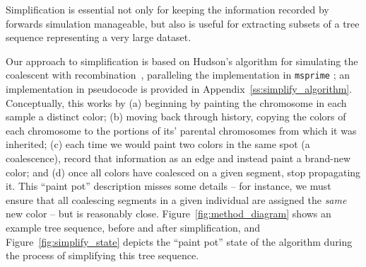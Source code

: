 \documentclass{article}
\newcommand{\msprime}{\texttt{msprime}}
\begin{document}
Simplification is essential
not only for keeping the information recorded by forwards simulation manageable,
but also is useful for extracting subsets of a tree sequence representing a very large dataset.

Our approach to simplification is based on Hudson's algorithm for simulating
the coalescent with recombination~\citep{hudson1983properties},
paralleling the implementation in \msprime{} \citep{kelleher2016efficient};
an implementation in pseudocode is provided in Appendix~\ref{ss:simplify_algorithm}.
Conceptually, this works by
(a) beginning by painting the chromosome in each sample a distinct color;
(b) moving back through history,
copying the colors of each chromosome to the portions of its' parental chromosomes
from which it was inherited;
(c) each time we would paint two colors in the same spot (a coalescence),
record that information as an edge and instead paint a brand-new color;
and
(d) once all colors have coalesced on a given segment,
stop propagating it.
This ``paint pot'' description misses some details --
for instance, we must ensure that all coalescing segments in a given individual
are assigned the \emph{same} new color --
but is reasonably close.
Figure~\ref{fig:method_diagram} shows an example tree sequence,
before and after simplification,
and Figure~\ref{fig:simplify_state} depicts the ``paint pot'' state of the algorithm
during the process of simplifying this tree sequence.
\end{document}
